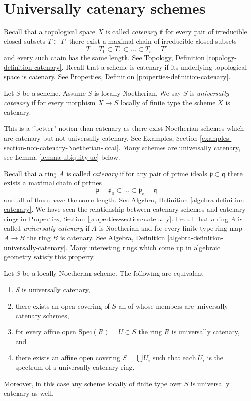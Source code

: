 \section{Universally catenary schemes}
\label{section-universally-catenary}

\noindent
Recall that a topological space $X$ is called {\it catenary} if
for every pair of irreducible closed subsets $T \subset T'$
there exist a maximal chain of irreducible closed subsets
$$
T = T_0 \subset T_1 \subset \ldots \subset T_e = T'
$$
and every such chain has the same length. See
Topology, Definition \ref{topology-definition-catenary}.
Recall that a scheme is catenary if its underlying topological space
is catenary. See Properties, Definition \ref{properties-definition-catenary}.

\begin{definition}
\label{definition-universally-catenary}
Let $S$ be a scheme. Assume $S$ is locally Noetherian.
We say $S$ is {\it universally catenary} if for every
morphism $X \to S$ locally of finite type the scheme $X$ is catenary.
\end{definition}

\noindent
This is a ``better'' notion than catenary as there exist Noetherian schemes
which are catenary but not universally catenary. See
Examples, Section \ref{examples-section-non-catenary-Noetherian-local}.
Many schemes are universally catenary, see
Lemma \ref{lemma-ubiquity-uc} below.

\medskip\noindent
Recall that a ring $A$ is called {\it catenary} if
for any pair of prime ideals $\mathfrak p \subset \mathfrak q$
there exists a maximal chain of primes
$$
\mathfrak p =
\mathfrak p_0 \subset \ldots \subset \mathfrak p_e
= \mathfrak q
$$
and all of these have the same length. See
Algebra, Definition \ref{algebra-definition-catenary}.
We have seen the relationship between catenary schemes and
catenary rings in Properties, Section \ref{properties-section-catenary}.
Recall that a ring $A$ is called {\it universally catenary} if
$A$ is Noetherian and for every finite type ring map $A \to B$
the ring $B$ is catenary. See
Algebra, Definition \ref{algebra-definition-universally-catenary}.
Many interesting rings which come up
in algebraic geometry satisfy this property.

\begin{lemma}
\label{lemma-universally-catenary-local}
Let $S$ be a locally Noetherian scheme. The following are equivalent
\begin{enumerate}
\item $S$ is universally catenary,
\item there exists an open covering of $S$ all of whose members are
universally catenary schemes,
\item for every affine open $\text{Spec}(R) = U \subset S$ the ring
$R$ is universally catenary, and
\item there exists an affine open covering $S = \bigcup U_i$ such
that each $U_i$ is the spectrum of a universally catenary ring.
\end{enumerate}
Moreover, in this case any scheme locally of finite type over $S$
is universally catenary as well.
\end{lemma}

